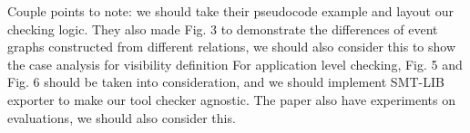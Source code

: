 {  Couple points to note: we should take their pseudocode example and layout our
  checking logic. They also made Fig. 3 to demonstrate the differences of event
  graphs constructed from different relations, we should also consider this to
  show the case analysis for visibility definition For application
  level checking,
  Fig. 5 and Fig. 6 should be taken into consideration, and we should implement
  SMT-LIB exporter to make our tool checker agnostic. The paper also have
  experiments on evaluations, we should also consider this.

}
